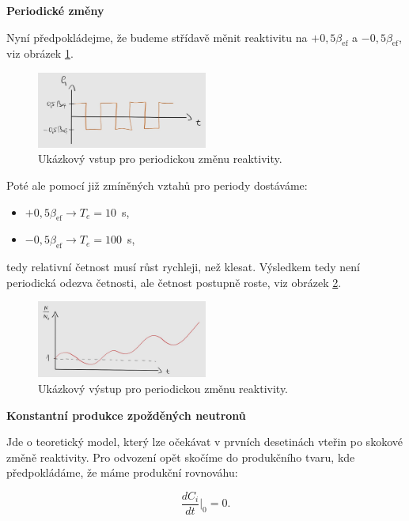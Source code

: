 \textbf{Periodické změny}

Nyní předpokládejme, že budeme střídavě měnit reaktivitu na $+ 0,5 \beta_{\text{ef}}$ a $- 0,5 \beta_{\text{ef}}$, viz obrázek \ref{fig_periodicke}.

\begin{figure}[H]
  \centering
  \includegraphics[width=0.5\textwidth]{img/periodicke.jpg}
  \caption{Ukázkový vstup pro periodickou změnu reaktivity.}
  \label{fig_periodicke}
\end{figure}

Poté ale pomocí již zmíněných vztahů pro periody dostáváme:

\begin{itemize}
  \item $+ 0,5 \beta_{\text{ef}} \rightarrow T_e = 10$~s,
  \item $- 0,5 \beta_{\text{ef}} \rightarrow T_e = 100$~s,
\end{itemize}

tedy relativní četnost musí růst rychleji, než klesat. Výsledkem tedy není periodická odezva četnosti, ale četnost postupně roste, viz obrázek \ref{fig_periodicke_reseni}.

\begin{figure}[H]
  \centering
  \includegraphics[width=0.5\textwidth]{img/periodicke_reseni.jpg}
  \caption{Ukázkový výstup pro periodickou změnu reaktivity.}
  \label{fig_periodicke_reseni}
\end{figure}

\textbf{Konstantní produkce zpožděných neutronů}

Jde o teoretický model, který lze očekávat v prvních desetinách vteřin po skokové změně reaktivity. Pro odvození opět skočíme do produkčního tvaru, kde předpokládáme, že máme produkční rovnováhu:

$$ \dfrac{dC_i}{dt} |_{0} = 0. $$

